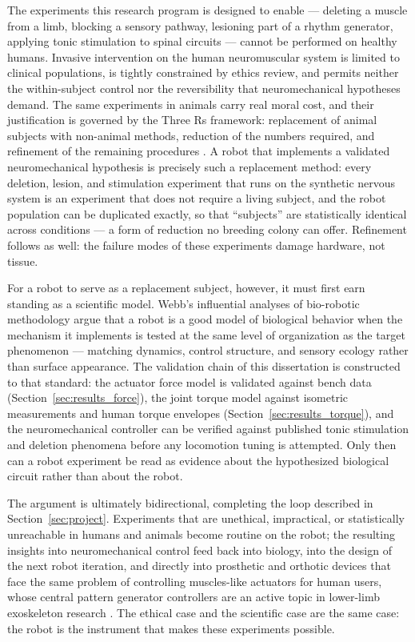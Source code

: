 The experiments this research program is designed to enable --- deleting a muscle from a limb, blocking a sensory pathway, lesioning part of a rhythm generator, applying tonic stimulation to spinal circuits --- cannot be performed on healthy humans. Invasive intervention on the human neuromuscular system is limited to clinical populations, is tightly constrained by ethics review, and permits neither the within-subject control nor the reversibility that neuromechanical hypotheses demand. The same experiments in animals carry real moral cost, and their justification is governed by the Three Rs framework: replacement of animal subjects with non-animal methods, reduction of the numbers required, and refinement of the remaining procedures \citep{russell_principles_1959, tannenbaum_russell_2015}. A robot that implements a validated neuromechanical hypothesis is precisely such a replacement method: every deletion, lesion, and stimulation experiment that runs on the synthetic nervous system is an experiment that does not require a living subject, and the robot population can be duplicated exactly, so that ``subjects'' are statistically identical across conditions --- a form of reduction no breeding colony can offer. Refinement follows as well: the failure modes of these experiments damage hardware, not tissue.

For a robot to serve as a replacement subject, however, it must first earn standing as a scientific model. Webb's influential analyses of bio-robotic methodology \citep{webb_robots_2001, webb_robots_2002} argue that a robot is a good model of biological behavior when the mechanism it implements is tested at the same level of organization as the target phenomenon --- matching dynamics, control structure, and sensory ecology rather than surface appearance. The validation chain of this dissertation is constructed to that standard: the actuator force model is validated against bench data (Section~\ref{sec:results_force}), the joint torque model against isometric measurements and human torque envelopes (Section~\ref{sec:results_torque}), and the neuromechanical controller can be verified against published tonic stimulation and deletion phenomena \citep{selionov_tonic_2009, rybak_modelling_2006} before any locomotion tuning is attempted. Only then can a robot experiment be read as evidence about the hypothesized biological circuit rather than about the robot.

The argument is ultimately bidirectional, completing the loop described in Section~\ref{sec:project}. Experiments that are unethical, impractical, or statistically unreachable in humans and animals become routine on the robot; the resulting insights into neuromechanical control feed back into biology, into the design of the next robot iteration, and directly into prosthetic and orthotic devices that face the same problem of controlling muscles-like actuators for human users, whose central pattern generator controllers are an active topic in lower-limb exoskeleton research \citep{duan_gait_2024, pery_benchmarking_2026}. The ethical case and the scientific case are the same case: the robot is the instrument that makes these experiments possible.
